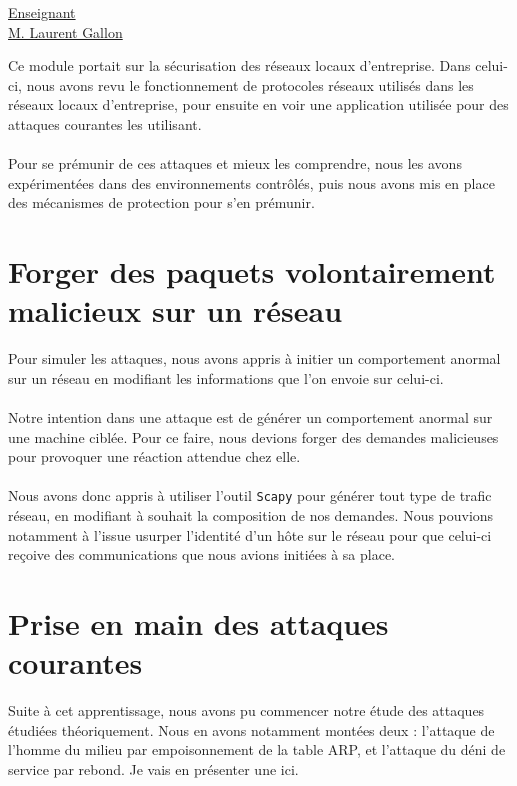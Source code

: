 \renewcommand{\figurename}{}

\vspace*{0.2cm}%
      \large
      \href{}{\color{black}Enseignant\\M. Laurent Gallon}\\%
      \normalsize
\vspace*{0.5cm}%

Ce module portait sur la sécurisation des réseaux locaux d'entreprise. Dans celui-ci, nous avons revu le fonctionnement de protocoles réseaux utilisés dans les réseaux locaux d'entreprise, pour ensuite en voir une application utilisée pour des attaques courantes les utilisant.
\\ \\
Pour se prémunir de ces attaques et mieux les comprendre, nous les avons expérimentées dans des environnements contrôlés, puis nous avons mis en place des mécanismes de protection pour s'en prémunir.

\section{Forger des paquets volontairement malicieux sur un réseau}


Pour simuler les attaques, nous avons appris à initier un comportement anormal sur un réseau en modifiant les informations que l'on envoie sur celui-ci.
\\ \\
Notre intention dans une attaque est de générer un comportement anormal sur une machine ciblée. Pour ce faire, nous devions forger des demandes malicieuses pour provoquer une réaction attendue chez elle.
\\ \\
Nous avons donc appris à utiliser l'outil \texttt{Scapy} pour générer tout type de trafic réseau, en modifiant à souhait la composition de nos demandes. Nous pouvions notamment à l'issue usurper l'identité d'un hôte sur le réseau pour que celui-ci reçoive des communications que nous avions initiées à sa place.

\section{Prise en main des attaques courantes}

Suite à cet apprentissage, nous avons pu commencer notre étude des attaques étudiées théoriquement. Nous en avons notamment montées deux : l'attaque de l'homme du milieu par empoisonnement de la table ARP, et l'attaque du déni de service par rebond. Je vais en présenter une ici.

